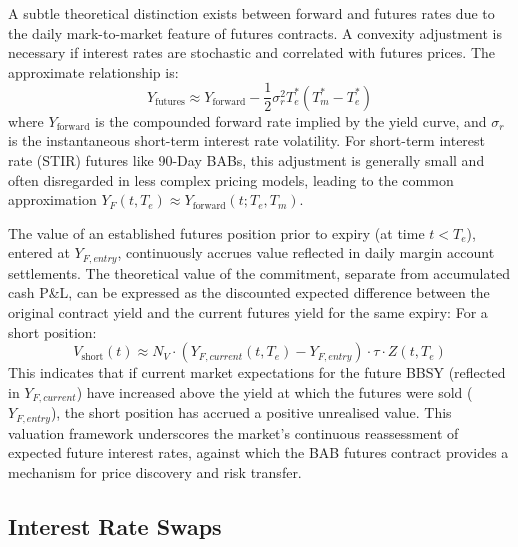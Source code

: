\documentclass[11pt, a4paper, british]{article}
\begin{document}
A subtle theoretical distinction exists between forward and futures rates due to the daily mark-to-market feature of futures contracts. A convexity adjustment is necessary if interest rates are stochastic and correlated with futures prices. The approximate relationship is:
\begin{equation} \label{eq:convexity_adjustment}
 Y_{\text{futures}} \approx Y_{\text{forward}} - \frac{1}{2} \sigma_r^2 T_e^* (T_m^* - T_e^*)
\end{equation}
where $Y_{\text{forward}}$ is the compounded forward rate implied by the yield curve, and $\sigma_r$ is the instantaneous short-term interest rate volatility. For short-term interest rate (STIR) futures like 90-Day BABs, this adjustment is generally small and often disregarded in less complex pricing models, leading to the common approximation $Y_F(t, T_e) \approx Y_{\text{forward}}(t; T_e, T_m)$.

The value of an established futures position prior to expiry (at time $t < T_e$), entered at $Y_{F, entry}$, continuously accrues value reflected in daily margin account settlements. The theoretical value of the commitment, separate from accumulated cash P\&L, can be expressed as the discounted expected difference between the original contract yield and the current futures yield for the same expiry:
For a short position:
\begin{equation} \label{eq:futures_valuation_t}
 V_{\text{short}}(t) \approx N_V \cdot (Y_{F,current}(t,T_e) - Y_{F,entry}) \cdot \tau \cdot Z(t, T_e)
\end{equation}
This indicates that if current market expectations for the future BBSY (reflected in $Y_{F, current}$) have increased above the yield at which the futures were sold ($Y_{F, entry}$), the short position has accrued a positive unrealised value. This valuation framework underscores the market's continuous reassessment of expected future interest rates, against which the BAB futures contract provides a mechanism for price discovery and risk transfer.
\newpage

\subsection{Interest Rate Swaps}
\end{document}
